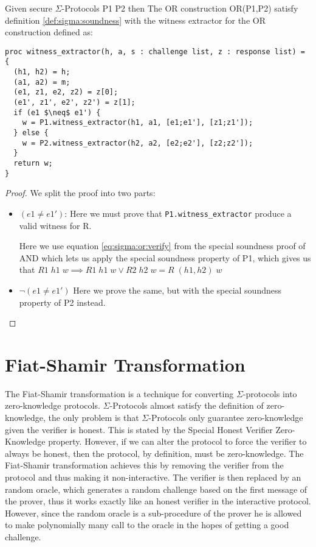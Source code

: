 \begin{lemma}
  Given secure $\Sigma$-Protocols P1 P2 then
  The OR construction OR(P1,P2) satisfy definition \ref{def:sigma:soundness} with the
  witness extractor for the OR construction defined as:
\begin{lstlisting}[mathescape]
proc witness_extractor(h, a, s : challenge list, z : response list) = {
  (h1, h2) = h;
  (a1, a2) = m;
  (e1, z1, e2, z2) = z[0];
  (e1', z1', e2', z2') = z[1];
  if (e1 $\neq$ e1') {
    w = P1.witness_extractor(h1, a1, [e1;e1'], [z1;z1']);
  } else {
    w = P2.witness_extractor(h2, a2, [e2;e2'], [z2;z2']);
  }
  return w;
}
\end{lstlisting}

\end{lemma}
\begin{proof}
  We split the proof into two parts:
  \begin{itemize}
    \item $(e1 \neq e1')$: Here we must prove that \texttt{P1.witness\_extractor} produce a valid witness for R.

      Here we use equation \ref{eq:sigma:or:verify} from the special soundness
      proof of AND which lets us apply the
      special soundness property of P1, which gives us that
      $R1 \; h1 \; w \implies R1 \; h1 \; w \lor R2 \; h2 \; w = R \; (h1, h2) \; w$
    \item $\neg(e1 \neq e1')$ Here we prove the same, but with the special
      soundness property of P2 instead.
  \end{itemize}
\end{proof}

\section{Fiat-Shamir Transformation}
\label{subsec:fiat-shamir}
The Fiat-Shamir transformation is a technique for converting $\Sigma$-protocols
into zero-knowledge protocols. $\Sigma$-Protocols almost satisfy the definition
of zero-knowledge, the only problem is that $\Sigma$-Protocols only guarantee
zero-knowledge given the verifier is honest. This is stated by the Special
Honest Verifier Zero-Knowledge property. However, if we can alter the protocol
to force the verifier to always be honest, then the protocol, by definition,
must be zero-knowledge.
The Fiat-Shamir transformation achieves this by removing the verifier from the
protocol and thus making it non-interactive. The verifier is then replaced by an
random oracle, which generates a random challenge based on the first message of
the prover, thus it works exactly like an honest verifier in the interactive
protocol. However, since the random oracle is a sub-procedure of the prover he
is allowed to make polynomially many call to the oracle in the hopes of getting
a good challenge.

